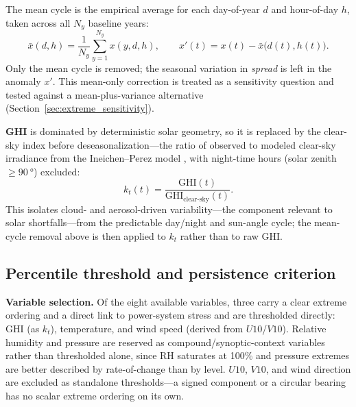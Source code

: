 The mean cycle is the empirical average for each day-of-year $d$ and hour-of-day $h$, taken across
all $N_y$ baseline years:
\[
\bar{x}(d,h) = \frac{1}{N_y}\sum_{y=1}^{N_y} x(y,d,h), \qquad
x'(t) = x(t) - \bar{x}\big(d(t), h(t)\big).
\]
Only the mean cycle is removed; the seasonal variation in \emph{spread} is left in the anomaly
$x'$. This mean-only correction is treated as a sensitivity question and tested against a
mean-plus-variance alternative (Section~\ref{sec:extreme_sensitivity}).

\textbf{GHI} is dominated by deterministic solar geometry, so it is replaced by the clear-sky
index before deseasonalization---the ratio of observed to modeled clear-sky irradiance from the
Ineichen--Perez model \citep{ineichen2002,marchesoniacland2022}, with night-time hours (solar
zenith $\ge \SI{90}{\degree}$) excluded:
\[
k_t(t) = \frac{\text{GHI}(t)}{\text{GHI}_{\text{clear-sky}}(t)}.
\]
This isolates cloud- and aerosol-driven variability---the component relevant to solar
shortfalls---from the predictable day/night and sun-angle cycle; the mean-cycle removal above is
then applied to $k_t$ rather than to raw GHI.

\subsection{Percentile threshold and persistence criterion}\label{sec:threshold_percentile}

\textbf{Variable selection.} Of the eight available variables, three carry a clear extreme
ordering and a direct link to power-system stress and are thresholded directly: GHI (as $k_t$),
temperature, and wind speed (derived from $U10$/$V10$). Relative humidity and pressure are
reserved as compound/synoptic-context variables rather than thresholded alone, since RH saturates
at 100\% and pressure extremes are better described by rate-of-change than by level. $U10$, $V10$,
and wind direction are excluded as standalone thresholds---a signed component or a circular
bearing has no scalar extreme ordering on its own.

